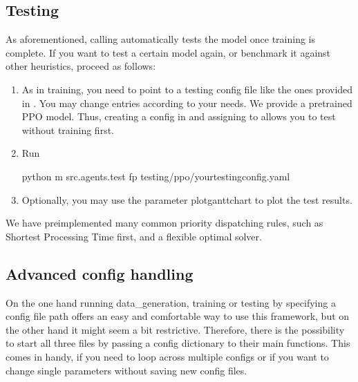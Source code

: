 \documentclass[letterpaper,10pt,english]{sphinxmanual}
\begin{document}
\subsection{Testing}
\label{\detokenize{quickstart:testing}}
\sphinxAtStartPar
As aforementioned, calling  automatically tests the model once training is complete. If you want to test a certain model again, or benchmark it against other heuristics, proceed as follows:
\begin{enumerate}
%
\item {} 
\sphinxAtStartPar
As in training, you need to point to a testing config file like the ones provided in .  You may change entries according to your needs.
We provide a pre\sphinxhyphen{}trained PPO model. Thus, creating a config in  and assigning  to  allows you to test without training first.

\item {} 
\sphinxAtStartPar
Run

\begin{sphinxVerbatim}[commandchars=\\\{\}]
python \PYGZhy{}m src.agents.test \PYGZhy{}fp testing/ppo/\PYGZlt{}your\PYGZus{}testing\PYGZus{}config\PYGZgt{}.yaml
\end{sphinxVerbatim}

\item {} 
\sphinxAtStartPar
Optionally, you may use the parameter \textendash{}plot\sphinxhyphen{}ganttchart to plot the test results.

\end{enumerate}

\sphinxAtStartPar
We have pre\sphinxhyphen{}implemented many common priority dispatching rules, such as Shortest Processing Time first, and a flexible optimal solver.


\subsection{Advanced config handling}
\label{\detokenize{quickstart:advanced-config-handling}}
\sphinxAtStartPar
On the one hand running data\_generation, training or testing by specifying a config file path offers an easy and comfortable way to use this framework, but on the other hand it might seem a bit restrictive.
Therefore, there is the possibility to start all three files by passing a config dictionary to their main functions.
This comes in handy, if you need to loop across multiple configs or if you want to change single parameters without saving new config files.
\end{document}
